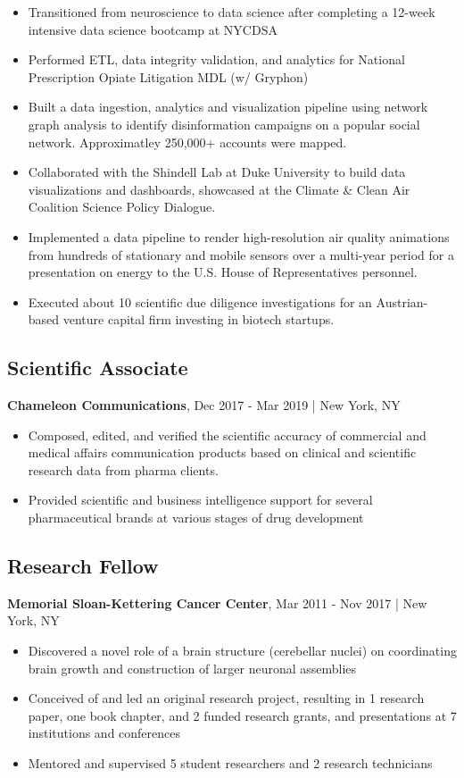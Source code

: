 \documentclass[11pt]{article}
\newenvironment{myitemize}
{ \begin{itemize}
	\setlength{\itemsep}{0pt}
	\setlength{\parskip}{0pt}
	\setlength{\parsep}{0pt}     }
{ \end{itemize}                  }
\begin{document}
\begin{myitemize}
	\item Transitioned from neuroscience to data science after completing a 12-week intensive data science bootcamp at NYCDSA 
	\item Performed ETL, data integrity validation, and analytics for National Prescription Opiate Litigation MDL (w/ Gryphon)
	\item Built a data ingestion, analytics and visualization pipeline using network graph analysis to identify disinformation campaigns on a popular social network. Approximatley 250,000+ accounts were mapped.
	\item Collaborated with the Shindell Lab at Duke University to build data visualizations and dashboards, showcased at the Climate \& Clean Air Coalition Science Policy Dialogue.
	\item Implemented a data pipeline to render high-resolution air quality animations from hundreds of stationary and mobile sensors over a multi-year period for a presentation on energy to the U.S. House of Representatives personnel. 
	\item Executed about 10 scientific due diligence investigations for an Austrian-based venture capital firm investing in biotech startups.
\end{myitemize}

\subsection*{Scientific Associate}
\vspace{-3truemm}
{\bfseries Chameleon Communications}, Dec 2017 - Mar 2019 | New York, NY
\begin{myitemize}
	\item Composed, edited, and verified the scientific accuracy of commercial and medical affairs communication products based on clinical and scientific research data from pharma clients.
	\item Provided scientific and business intelligence support for several pharmaceutical brands at various stages of drug development
\end{myitemize}

\subsection*{Research Fellow}
\vspace{-3truemm}
{\bfseries Memorial Sloan-Kettering Cancer Center}, Mar 2011 - Nov 2017 | New York, NY
\begin{myitemize}
	\item Discovered a novel role of a brain structure (cerebellar nuclei) on coordinating brain growth and construction of larger neuronal assemblies
	\item Conceived of and led an original research project, resulting in 1 research paper, one book chapter, and 2 funded research grants, and presentations at 7 institutions and conferences
	\item Mentored and supervised 5 student researchers and 2 research technicians
\end{myitemize}
\end{document}

